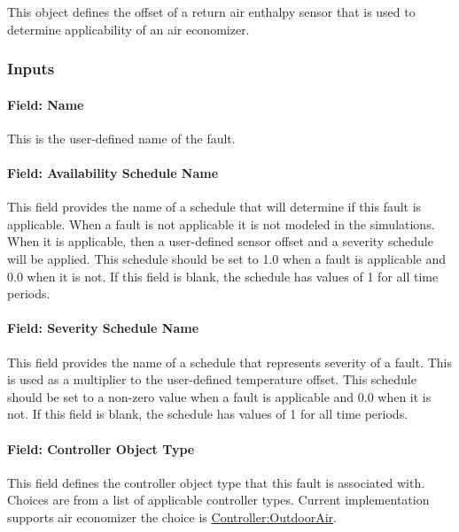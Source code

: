 This object defines the offset of a return air enthalpy sensor that is used to determine applicability of an air economizer.

\subsubsection{Inputs}\label{inputs-4-020}

\paragraph{Field: Name}\label{field-name-4-017}

This is the user-defined name of the fault.

\paragraph{Field: Availability Schedule Name}\label{field-availability-schedule-name-4-004}

This field provides the name of a schedule that will determine if this fault is applicable. When a fault is not applicable it is not modeled in the simulations. When it is applicable, then a user-defined sensor offset and a severity schedule will be applied. This schedule should be set to 1.0 when a fault is applicable and 0.0 when it is not. If this field is blank, the schedule has values of 1 for all time periods.

\paragraph{Field: Severity Schedule Name}\label{field-severity-schedule-name-4}

This field provides the name of a schedule that represents severity of a fault. This is used as a multiplier to the user-defined temperature offset. This schedule should be set to a non-zero value when a fault is applicable and 0.0 when it is not. If this field is blank, the schedule has values of 1 for all time periods.

\paragraph{Field: Controller Object Type}\label{field-controller-object-type-4}

This field defines the controller object type that this fault is associated with. Choices are from a list of applicable controller types. Current implementation supports air economizer the choice is \hyperref[controlleroutdoorair]{Controller:OutdoorAir}.

